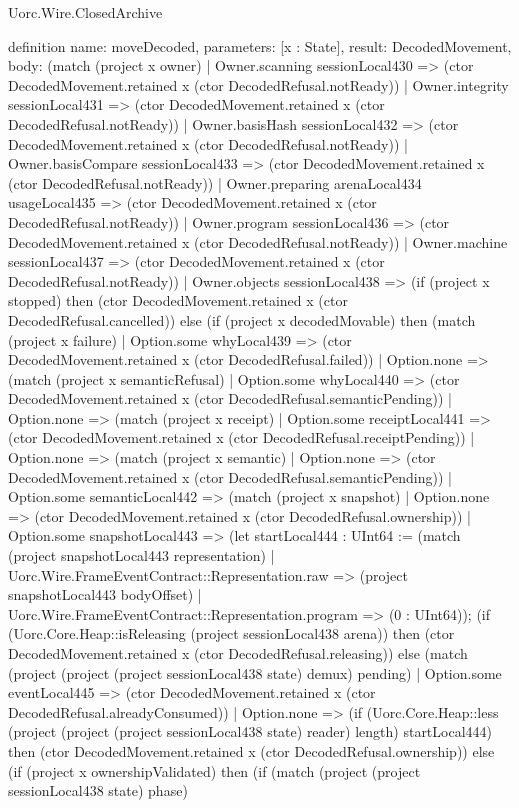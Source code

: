 \begin{lexlean}{Uorc.Wire.ClosedArchive}
\begin{semanticmodule}
definition{
  name: moveDecoded,
  parameters: [x : State],
  result: DecodedMovement,
  body: (match (project x owner)
    | Owner.scanning sessionLocal430 => (ctor DecodedMovement.retained x (ctor DecodedRefusal.notReady))
    | Owner.integrity sessionLocal431 => (ctor DecodedMovement.retained x (ctor DecodedRefusal.notReady))
    | Owner.basisHash sessionLocal432 => (ctor DecodedMovement.retained x (ctor DecodedRefusal.notReady))
    | Owner.basisCompare sessionLocal433 => (ctor DecodedMovement.retained x (ctor DecodedRefusal.notReady))
    | Owner.preparing arenaLocal434 usageLocal435 => (ctor DecodedMovement.retained x (ctor DecodedRefusal.notReady))
    | Owner.program sessionLocal436 => (ctor DecodedMovement.retained x (ctor DecodedRefusal.notReady))
    | Owner.machine sessionLocal437 => (ctor DecodedMovement.retained x (ctor DecodedRefusal.notReady))
    | Owner.objects sessionLocal438 => (if (project x stopped) then (ctor DecodedMovement.retained x (ctor DecodedRefusal.cancelled)) else (if (project x decodedMovable) then (match (project x failure)
      | Option.some whyLocal439 => (ctor DecodedMovement.retained x (ctor DecodedRefusal.failed))
      | Option.none => (match (project x semanticRefusal)
        | Option.some whyLocal440 => (ctor DecodedMovement.retained x (ctor DecodedRefusal.semanticPending))
        | Option.none => (match (project x receipt)
          | Option.some receiptLocal441 => (ctor DecodedMovement.retained x (ctor DecodedRefusal.receiptPending))
          | Option.none => (match (project x semantic)
            | Option.none => (ctor DecodedMovement.retained x (ctor DecodedRefusal.semanticPending))
            | Option.some semanticLocal442 => (match (project x snapshot)
              | Option.none => (ctor DecodedMovement.retained x (ctor DecodedRefusal.ownership))
              | Option.some snapshotLocal443 => (let startLocal444 : UInt64 := (match (project snapshotLocal443 representation)
                | Uorc.Wire.FrameEventContract::Representation.raw => (project snapshotLocal443 bodyOffset)
                | Uorc.Wire.FrameEventContract::Representation.program => (0 : UInt64)); (if (Uorc.Core.Heap::isReleasing (project sessionLocal438 arena)) then (ctor DecodedMovement.retained x (ctor DecodedRefusal.releasing)) else (match (project (project (project sessionLocal438 state) demux) pending)
                | Option.some eventLocal445 => (ctor DecodedMovement.retained x (ctor DecodedRefusal.alreadyConsumed))
                | Option.none => (if (Uorc.Core.Heap::less (project (project (project sessionLocal438 state) reader) length) startLocal444) then (ctor DecodedMovement.retained x (ctor DecodedRefusal.ownership)) else (if (project x ownershipValidated) then (if (match (project (project sessionLocal438 state) phase)
}
\end{semanticmodule}
\end{lexlean}
